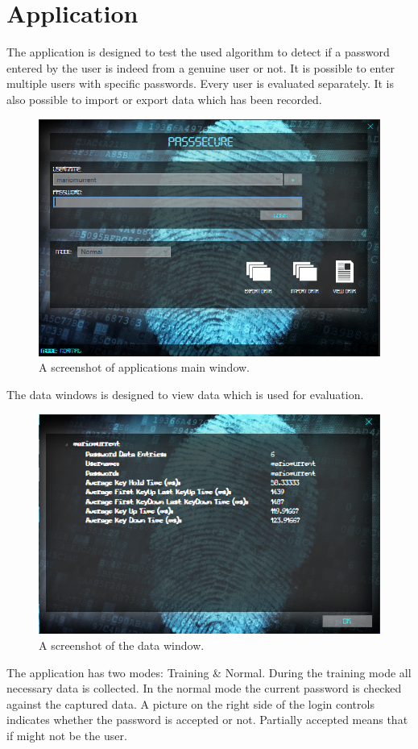 \documentclass[fleqn,10pt]{SelfArx} %
\begin{document}
\section{Application}
The application is designed to test the used algorithm to detect if a password entered by the user is indeed from a genuine user or not. It is possible to enter multiple users with specific passwords. Every user is evaluated separately. It is also possible to import or export data which has been recorded.
\begin{figure}[!htb]
\includegraphics[scale=0.5]{application}
 \caption{A screenshot of applications main window.}
\end{figure}
The data windows is designed to view data which is used for evaluation.
\begin{figure}[!htb]
\includegraphics[scale=0.6]{viewData}
 \caption{A screenshot of the data window.}
\end{figure}
The application has two modes: Training \& Normal. During the training mode all necessary data is collected. In the normal mode the current password is checked against the captured data. A picture on the right side of the login controls indicates whether the password is accepted or not. Partially accepted means that if might not be the user.
\end{document}
